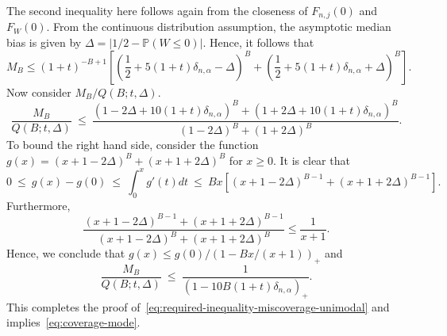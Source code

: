 \documentclass{article}
\numberwithin{myalgctr}{section}
\begin{document}
The second inequality here follows again from the closeness of $F_{n,j}(0)$ and $F_W(0)$.
From the continuous distribution assumption, the asymptotic median bias is given by $\Delta = |1/2 - \mathbb{P}(W \le 0)|$. Hence, it follows that
\begin{equation}\label{eq:final-inequality-M-B}
M_B \le (1 + t)^{-B+1}\left[\left(\frac{1}{2} + 5(1 + t)\delta_{n,\alpha} - \Delta\right)^B + \left(\frac{1}{2} + 5(1 + t)\delta_{n,\alpha} + \Delta\right)^B\right].
\end{equation}
Now consider $M_B/Q(B; t, \Delta)$. 
\[
\frac{M_B}{Q(B; t, \Delta)} ~\le~ \frac{(1 - 2\Delta + 10(1 + t)\delta_{n,\alpha})^B + (1 + 2\Delta + 10(1 + t)\delta_{n,\alpha})^B}{(1 - 2\Delta)^B + (1 + 2\Delta)^B}.
\]
To bound the right hand side, consider the function $g(x) = (x + 1-2\Delta)^B + (x + 1 + 2\Delta)^B$ for $x \ge 0$. It is clear that
\[
0 ~\le~ g(x) - g(0) ~\le~ \int_0^x g'(t)dt ~\le~ Bx\left[(x + 1 - 2\Delta)^{B-1} + (x + 1 + 2\Delta)^{B-1}\right].
\]
Furthermore,
\[
\frac{(x + 1 - 2\Delta)^{B-1} + (x + 1 + 2\Delta)^{B-1}}{(x + 1 - 2\Delta)^{B} + (x + 1 + 2\Delta)^B} \le \frac{1}{x + 1}.
\]
Hence, we conclude that $g(x) \le g(0)/(1 - Bx/(x + 1))_+$ and
\[
\frac{M_B}{Q(B; t, \Delta)} ~\le~ \frac{1}{(1 - 10B(1 + t)\delta_{n,\alpha})_+}.
\]
This completes the proof of~\eqref{eq:required-inequality-miscoverage-unimodal} and implies~\eqref{eq:coverage-mode}.
\end{document}
